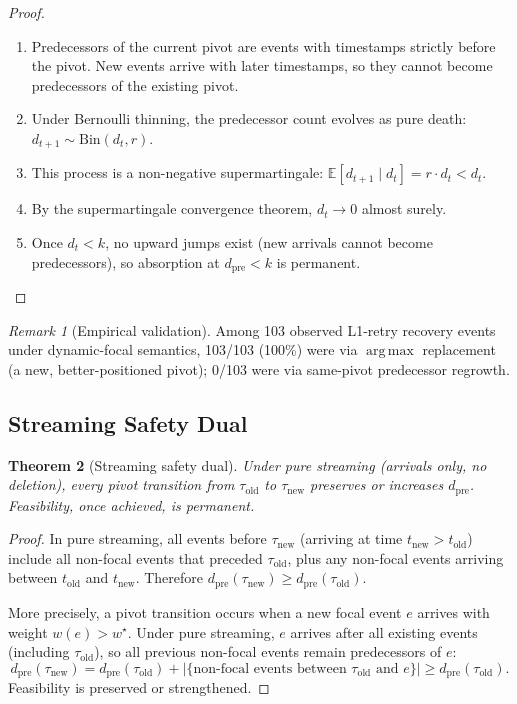 \documentclass[11pt]{article}
\theoremstyle{plain}
\newtheorem{theorem}{Theorem}[section]
\theoremstyle{definition}
\theoremstyle{remark}
\newtheorem{remark}[theorem]{Remark}
\newcommand{\wstar}{{w^{\star}}}
\newcommand{\dpre}[1][]{d_{\mathrm{pre}#1}}
\DeclareMathOperator*{\argmax}{arg\,max}
\begin{document}
\begin{proof}
\begin{enumerate}[label=\arabic*.,nosep]
  \item Predecessors of the current pivot are events with timestamps
    strictly before the pivot.  New events arrive with later timestamps,
    so they cannot become predecessors of the existing pivot.
  \item Under Bernoulli thinning, the predecessor count evolves as
    pure death: $d_{t+1} \sim \mathrm{Bin}(d_t, r)$.
  \item This process is a non-negative supermartingale:
    $\mathbb{E}[d_{t+1} \mid d_t] = r \cdot d_t < d_t$.
  \item By the supermartingale convergence theorem, $d_t \to 0$ almost
    surely.
  \item Once $d_t < k$, no upward jumps exist (new arrivals cannot
    become predecessors), so absorption at $\dpre < k$ is permanent.
    \qedhere
\end{enumerate}
\end{proof}

\begin{remark}[Empirical validation]\label{rem:turnover-empirical}
Among 103 observed L1-retry recovery events under dynamic-focal
semantics, 103/103 (100\%) were via $\argmax$ replacement (a new,
better-positioned pivot); 0/103 were via same-pivot predecessor
regrowth.
\end{remark}

\subsection{Streaming Safety Dual}

\begin{theorem}[Streaming safety dual]\label{thm:streaming-safety}
Under pure streaming (arrivals only, no deletion), every pivot
transition from $\tau_{\mathrm{old}}$ to $\tau_{\mathrm{new}}$
preserves or increases $\dpre$.  Feasibility, once achieved, is
permanent.
\end{theorem}

\begin{proof}
In pure streaming, all events before $\tau_{\mathrm{new}}$ (arriving at
time $t_{\mathrm{new}} > t_{\mathrm{old}}$) include all non-focal
events that preceded $\tau_{\mathrm{old}}$, plus any non-focal events
arriving between $t_{\mathrm{old}}$ and $t_{\mathrm{new}}$.  Therefore
$\dpre(\tau_{\mathrm{new}}) \ge \dpre(\tau_{\mathrm{old}})$.

More precisely, a pivot transition occurs when a new focal event $e$
arrives with weight $w(e) > \wstar$.  Under pure streaming, $e$
arrives after all existing events (including $\tau_{\mathrm{old}}$),
so all previous non-focal events remain predecessors of $e$:
\[
  \dpre(\tau_{\mathrm{new}}) = \dpre(\tau_{\mathrm{old}})
  + |\{\text{non-focal events between }
  \tau_{\mathrm{old}} \text{ and } e\}|
  \ge \dpre(\tau_{\mathrm{old}}).
\]
Feasibility is preserved or strengthened.
\end{proof}
\end{document}
